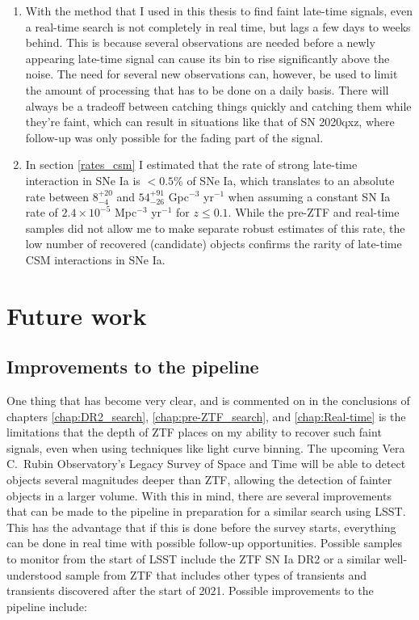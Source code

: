 \documentclass[a4paper,oneside,12pt, class=Latex/Classes/PhDthesisPSnPDF, crop=false]{standalone}
\begin{document}
\begin{enumerate}
	\item With the method that I used in this thesis to find faint late-time signals, even a real-time search is not completely in real time, but lags a few days to weeks behind. This is because several observations are needed before a newly appearing late-time signal can cause its bin to rise significantly above the noise. The need for several new observations can, however, be used to limit the amount of processing that has to be done on a daily basis. There will always be a tradeoff between catching things quickly and catching them while they're faint, which can result in situations like that of SN 2020qxz, where follow-up was only possible for the fading part of the signal.
	\item In section \ref{rates_csm} I estimated that the rate of strong late-time interaction in SNe Ia is $<0.5$\% of SNe Ia, which translates to an absolute rate between $8_{-4}^{+20}$ and $54_{-26}^{+91}$ Gpc$^{-3}$ yr$^{-1}$ when assuming a constant SN Ia rate of $2.4\times10^{-5}$ Mpc$^{-3}$ yr$^{-1}$ for $z \leq 0.1$. While the pre-ZTF and real-time samples did not allow me to make separate robust estimates of this rate, the low number of recovered (candidate) objects confirms the rarity of late-time CSM interactions in SNe Ia.
\end{enumerate}


\section{Future work}
\subsection{Improvements to the pipeline}
One thing that has become very clear, and is commented on in the conclusions of chapters \ref{chap:DR2_search}, \ref{chap:pre-ZTF_search}, and \ref{chap:Real-time} is the limitations that the depth of ZTF places on my ability to recover such faint signals, even when using techniques like light curve binning. The upcoming Vera C.~Rubin Observatory's Legacy Survey of Space and Time \cite[LSST;][]{LSST} will be able to detect objects several magnitudes deeper than ZTF, allowing the detection of fainter objects in a larger volume. With this in mind, there are several improvements that can be made to the pipeline in preparation for a similar search using LSST. This has the advantage that if this is done before the survey starts, everything can be done in real time with possible follow-up opportunities. Possible samples to monitor from the start of LSST include the ZTF SN Ia DR2 or a similar well-understood sample from ZTF that includes other types of transients and transients discovered after the start of 2021. Possible improvements to the pipeline include:
\end{document}
